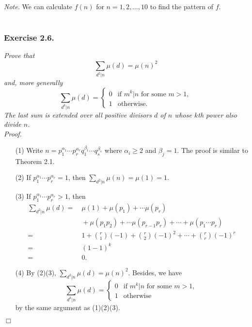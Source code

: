 \documentclass{article}
\begin{document}
\emph{Note.}
We can calculate $f(n)$ for $n = 1, 2, \ldots, 10$ to find the pattern of $f$. \\\\






\subsubsection*{Exercise 2.6.}
\emph{Prove that
\[
  \sum_{d^2 | n} \mu(d) = \mu(n)^2
\]
and, more generally
\begin{equation*}
  \sum_{d^k | n} \mu(d) =
  \begin{cases}
    0 & \text{if $m^k | n$ for some $m > 1$}, \\
    1 & \text{otherwise}.
  \end{cases}
\end{equation*}
The last sum is extended over all positive divisors $d$ of $n$
whose $k$th power also divide $n$.} \\



\emph{Proof.}
\begin{enumerate}
\item[(1)]
  Write $n = p_1^{\alpha_1} \cdots p_r^{\alpha_r} q_1^{\beta_1} \cdots q_s^{\beta_s}$
  where $\alpha_i \geq 2$ and $\beta_j = 1$.
  The proof is similar to Theorem 2.1.

\item[(2)]
  If $p_1^{\alpha_1} \cdots p_r^{\alpha_r} = 1$,
  then $\sum_{d^2 | n} \mu(n) = \mu(1) = 1$.

\item[(3)]
  If $p_1^{\alpha_1} \cdots p_r^{\alpha_r} > 1$,
  then
  \begin{align*}
    \sum_{d^2 | n} \mu(d)
    = & \: \mu(1) + \mu(p_1) + \cdots \mu(p_r) \\
      & \: + \mu(p_1 p_2) + \cdots \mu(p_{r-1} p_r) + \cdots + \mu(p_1 \cdots p_r) \\
    = & \: 1 + {r \choose 1}(-1) + {r \choose 2}(-1)^2 + \cdots + {r \choose r}(-1)^r \\
    = & \: (1-1)^k \\
    = & \: 0.
  \end{align*}

\item[(4)]
  By (2)(3), $\sum_{d^2 | n} \mu(d) = \mu(n)^2$.
  Besides, we have
  \begin{equation*}
    \sum_{d^k | n} \mu(d) =
    \begin{cases}
      0 & \text{if $m^k | n$ for some $m > 1$}, \\
      1 & \text{otherwise}
    \end{cases}
  \end{equation*}
  by the same argument as (1)(2)(3).
\end{enumerate}
$\Box$ \\\\
\end{document}

